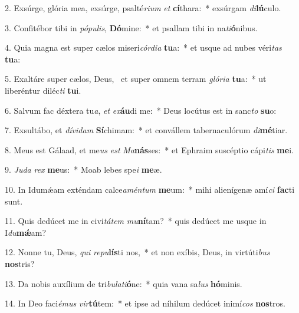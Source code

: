 2. Exsúrge, glória mea, exsúrge, psalté\textit{ri}\textit{um} \textit{et} \textbf{cí}thara:~*  exsúrgam \textit{di}\textbf{lú}culo.\

3. Confitébor tibi in \textit{pó}\textit{pu}\textit{lis}, \textbf{Dó}mine:~*  et psallam tibi in na\textit{ti}\textbf{ó}nibus.\

4. Quia magna est super cælos miseri\textit{cór}\textit{di}\textit{a} \textbf{tu}a:~*  et usque ad nubes véri\textit{tas} \textbf{tu}a:\

5. Exaltáre super cælos, Deus, \dag\  et super omnem terram \textit{gló}\textit{ri}\textit{a} \textbf{tu}a:~*  ut liberéntur diléc\textit{ti} \textbf{tu}i.\

6. Salvum fac déxtera tu\textit{a}, \textit{et} \textit{ex}\textbf{áu}di me:~*  Deus locútus est in sanc\textit{to} \textbf{su}o:\

7. Exsultábo, et \textit{dí}\textit{vi}\textit{dam} \textbf{Sí}chimam:~*  et convállem tabernaculórum \textit{di}\textbf{mé}tiar.\

8. Meus est Gálaad, et me\textit{us} \textit{est} \textit{Ma}\textbf{nás}ses:~*  et Ephraim suscéptio cápi\textit{tis} \textbf{me}i.\

9. \textit{Ju}\textit{da} \textit{rex} \textbf{me}us:~*  Moab lebes spe\textit{i} \textbf{me}æ.\

10. In Idumǽam exténdam calce\textit{a}\textit{mén}\textit{tum} \textbf{me}um:~*  mihi alienígenæ amí\textit{ci} \textbf{fac}ti sunt.\

11. Quis dedúcet me in civi\textit{tá}\textit{tem} \textit{mu}\textbf{ní}tam?~*  quis dedúcet me usque in I\textit{du}\textbf{mǽ}am?\

12. Nonne tu, Deus, \textit{qui} \textit{re}\textit{pu}\textbf{lís}ti nos,~*  et non exíbis, Deus, in virtúti\textit{bus} \textbf{nos}tris?\

13. Da nobis auxílium de tri\textit{bu}\textit{la}\textit{ti}\textbf{ó}ne:~*  quia vana sa\textit{lus} \textbf{hó}minis.\

14. In Deo faci\textit{é}\textit{mus} \textit{vir}\textbf{tú}tem:~*  et ipse ad níhilum dedúcet inimí\textit{cos} \textbf{nos}tros.\

